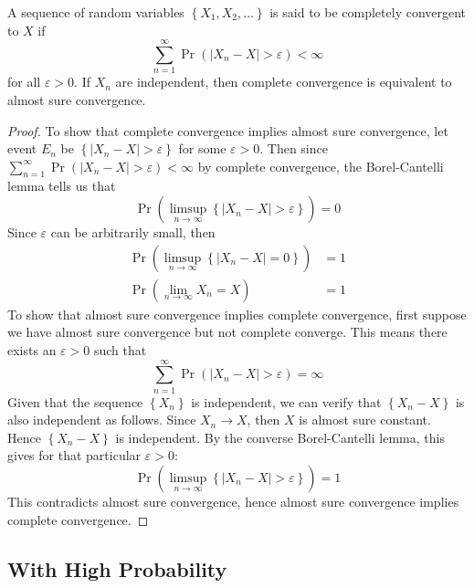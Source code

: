 \documentclass[11pt]{report} %
\begin{document}
A sequence of random variables $\left\{X_{1}, X_{2}, \dots \right\}$ is said to be completely convergent to $X$ if
\begin{equation}
\sum_{n = 1}^{\infty}\operatorname{Pr}\left(\left|X_{n} - X\right| > \varepsilon\right) < \infty
\end{equation}
for all $\varepsilon > 0$. If $X_{n}$ are independent, then complete convergence is equivalent to almost sure convergence.
\begin{proof}
To show that complete convergence implies almost sure convergence, let event $E_{n}$ be $\left\{\left|X_{n} - X\right| > \varepsilon\right\}$ for some $\varepsilon > 0$. Then since $\sum_{n = 1}^{\infty}\operatorname{Pr}\left(\left|X_{n} - X\right| > \varepsilon\right) < \infty$ by complete convergence, the Borel-Cantelli lemma tells us that
\begin{equation}
\operatorname{Pr}\left(\limsup_{n\to\infty}\left\{\left|X_{n} - X\right| > \varepsilon\right\}\right) = 0
\end{equation}
Since $\varepsilon$ can be arbitrarily small, then
\begin{align}
\operatorname{Pr}\left(\limsup_{n\to\infty}\left\{\left|X_{n} - X\right| = 0\right\}\right) &= 1 \\
\operatorname{Pr}\left(\lim_{n\to\infty}X_{n} = X\right) &= 1
\end{align}
To show that almost sure convergence implies complete convergence, first suppose we have almost sure convergence but not complete converge. This means there exists an $\varepsilon > 0$ such that
\begin{equation}
\sum_{n = 1}^{\infty}\operatorname{Pr}\left(\left|X_{n} - X\right| > \varepsilon\right) = \infty
\end{equation}
Given that the sequence $\left\{X_{n}\right\}$ is independent, we can verify that $\left\{X_{n} - X\right\}$ is also independent as follows. Since $X_{n} \to X$, then $X$ is almost sure constant. Hence $\left\{X_{n} - X\right\}$ is independent. By the converse Borel-Cantelli lemma, this gives for that particular $\varepsilon > 0$:
\begin{equation}
\operatorname{Pr}\left(\limsup_{n\to\infty}\left\{\left|X_{n} - X\right| > \varepsilon\right\}\right) = 1
\end{equation}
This contradicts almost sure convergence, hence almost sure convergence implies complete convergence.
\end{proof}

\subsection{With High Probability}
\end{document}
